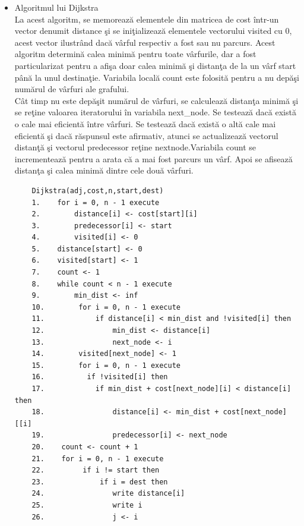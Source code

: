 \documentclass{article}
\begin{document}
\begin{itemize}
    \item Algoritmul lui Dijkstra\\
    La acest algoritm, se memoreaz\u{a} elementele din matricea de cost \^{i}ntr-un vector denumit  distance \c{s}i se ini\c{t}ializeaz\u{a} elementele vectorului visited cu 0, acest vector ilustr\^{a}nd dac\u{a} v\^{a}rful respectiv a fost sau nu parcurs. Acest algoritm determin\u{a} calea minim\u{a} pentru toate v\^{a}rfurile, dar a fost particularizat pentru a afi\c{s}a doar calea minim\u{a} \c{s}i distan\c{t}a de la un v\^{a}rf start p\^{a}n\u{a} la unul destina\c{t}ie. Variabila local\u{a} count este folosit\u{a} pentru a nu dep\u{a}\c{s}i num\u{a}rul de v\^{a}rfuri ale grafului. \\
    C\^{a}t timp nu este dep\u{a}\c{s}it num\u{a}rul de v\^{a}rfuri, se calculeaz\u{a} distan\c{t}a minim\u{a} \c{s}i se re\c{t}ine valoarea iteratorului \^{i}n variabila next\_node. Se testeaz\u{a} dac\u{a} exist\u{a} o cale mai eficient\u{a} \^{i}ntre v\^{a}rfuri. Se testeaz\u{a} dac\u{a} exist\u{a} o alt\u{a} cale mai eficient\u{a} \c{s}i dac\u{a} r\u{a}spunsul este afirmativ, atunci se actualizeaz\u{a} vectorul distan\c{t}\u{a} \c{s}i vectorul predecessor re\c{t}ine nextnode.Variabila count se incrementeaz\u{a} pentru a arata c\u{a} a mai fost parcurs un v\^{a}rf. Apoi se afiseaz\u{a} distan\c{t}a \c{s}i calea minim\u{a} dintre cele dou\u{a} v\^{a}rfuri.
    \begin{lstlisting}
    Dijkstra(adj,cost,n,start,dest)
    1.    for i = 0, n - 1 execute
    2.        distance[i] <- cost[start][i]
    3.        predecessor[i] <- start
    4.        visited[i] <- 0
    5.    distance[start] <- 0
    6.    visited[start] <- 1
    7.    count <- 1
    8.    while count < n - 1 execute
    9.        min_dist <- inf
    10.        for i = 0, n - 1 execute
    11.            if distance[i] < min_dist and !visited[i] then
    12.                min_dist <- distance[i]
    13.                next_node <- i
    14.        visited[next_node] <- 1
    15.        for i = 0, n - 1 execute
    16.          if !visited[i] then
    17.            if min_dist + cost[next_node][i] < distance[i] then
    18.                distance[i] <- min_dist + cost[next_node][[i]
    19.                predecessor[i] <- next_node
    20.    count <- count + 1
    21.    for i = 0, n - 1 execute
    22.         if i != start then
    23.             if i = dest then
    24.                write distance[i]
    25.                write i
    26.                j <- i

\end{lstlisting}
\end{itemize}
\end{document}
